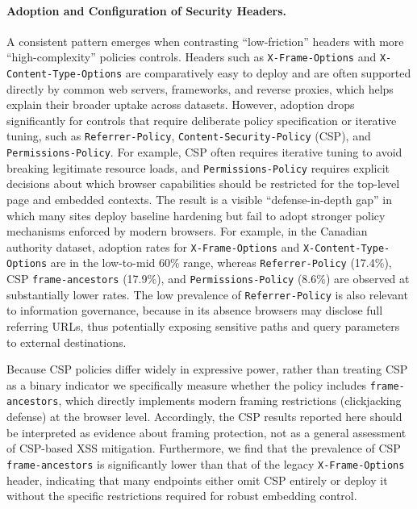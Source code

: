\documentclass[a4paper,fleqn]{cas-sc}
\begin{document}
\paragraph{Adoption and Configuration of Security Headers.}
    A consistent pattern emerges when contrasting ``low-friction'' headers with more ``high-complexity'' policies controls. 
    Headers such as \texttt{X-Frame-Options} and \texttt{X-Content-Type-Options} are comparatively easy to deploy and are often supported directly by common web servers, frameworks, and reverse proxies, which helps explain their broader uptake across datasets.
    However, adoption drops significantly for controls that require deliberate policy specification or iterative tuning, such as \texttt{Referrer-Policy}, \texttt{Content-Security-Policy} (CSP), and \texttt{Permissions-Policy}.
    For example, CSP often requires iterative tuning to avoid breaking legitimate resource loads, and \texttt{Permissions-Policy} requires explicit decisions about which browser capabilities should be restricted for the top-level page and embedded contexts.
    The result is a visible ``defense-in-depth gap'' in which many sites deploy baseline hardening but fail to adopt stronger policy mechanisms enforced by modern browsers.
    For example, in the Canadian authority dataset, adoption rates for \texttt{X-Frame-Options} and \texttt{X-Content-Type-Options} are in the low-to-mid 60\% range, whereas \texttt{Referrer-Policy} (17.4\%), CSP \texttt{frame-ancestors} (17.9\%), and \texttt{Permissions-Policy} (8.6\%) are observed at substantially lower rates. The low prevalence of \texttt{Referrer-Policy} is also relevant to information governance, because in its absence browsers may disclose full referring URLs, thus potentially exposing sensitive paths and query parameters to external destinations.
    
    Because CSP policies differ widely in expressive power, rather than treating CSP as a binary indicator we specifically measure whether the policy includes \texttt{frame-ancestors}, which directly implements modern framing restrictions (clickjacking defense) at the browser level. Accordingly, the CSP results reported here should be interpreted as evidence about framing protection, not as a general assessment of CSP-based XSS mitigation.
    Furthermore, we find that the prevalence of CSP \texttt{frame-ancestors} is significantly lower than that of the legacy \texttt{X-Frame-Options} header, indicating that many endpoints either omit CSP entirely or deploy it without the specific restrictions required for robust embedding control.
    
\end{document}
